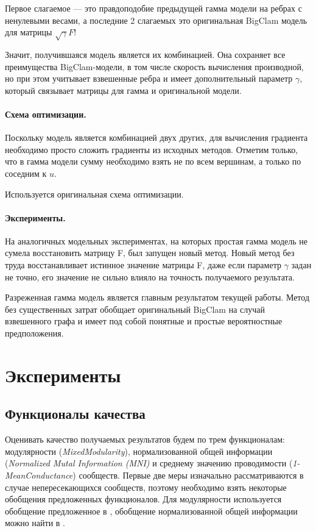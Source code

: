 \documentclass{ITaSconf}
\begin{document}
Первое слагаемое --- это правдоподобие предыдущей гамма модели на ребрах с ненулевыми весами, а последние 2 слагаемых это оригинальная BigClam модель для матрицы $\sqrt \gamma F$! 

Значит, получившаяся модель является их комбинацией. 
Она сохраняет все преимущества BigClam-модели, в том числе скорость вычисления производной, но при этом учитывает взвешенные ребра и имеет дополнительный параметр $\gamma$, который связывает матрицы для гамма и оригинальной модели.

\paragraph{Схема оптимизации.} Поскольку модель является комбинацией двух других, для вычисления градиента необходимо просто сложить градиенты из исходных методов.
Отметим только, что в гамма модели сумму необходимо взять не по всем вершинам, а только по соседним к $u$.

Используется оригинальная схема оптимизации.

\paragraph{Эксперименты.} 
На аналогичных модельных экспериментах, на которых простая гамма модель не сумела восстановить матрицу F, был запущен новый метод.
Новый метод без труда восстанавливает истинное значение матрицы F, даже если параметр $\gamma$ задан не точно, его значение не сильно влияло на точность получаемого результата.  

Разреженная гамма модель является главным результатом текущей работы. 
Метод без существенных затрат обобщает оригинальный BigClam на случай взвешенного графа и имеет под собой понятные и простые вероятностные предположения.

\section{Эксперименты}

\subsection{Функционалы качества}
Оценивать качество получаемых результатов будем по трем функционалам: модулярности (\textit{MixedModularity}), нормализованной общей информации (\textit{Normalized Mutal Information (MNI)} и среднему значению проводимости (\textit{1-MeanConductance}) сообществ.
Первые две меры изначально рассматриваются в случае непересекающихся сообществ, поэтому необходимо взять некоторые обобщения предложенных функционалов. Для модулярности используется обобщение предложенное в \cite{xie2013overlapping}, обобщение нормализованной общей информации можно найти в \cite{lancichinetti2009detecting}. 
\end{document}
